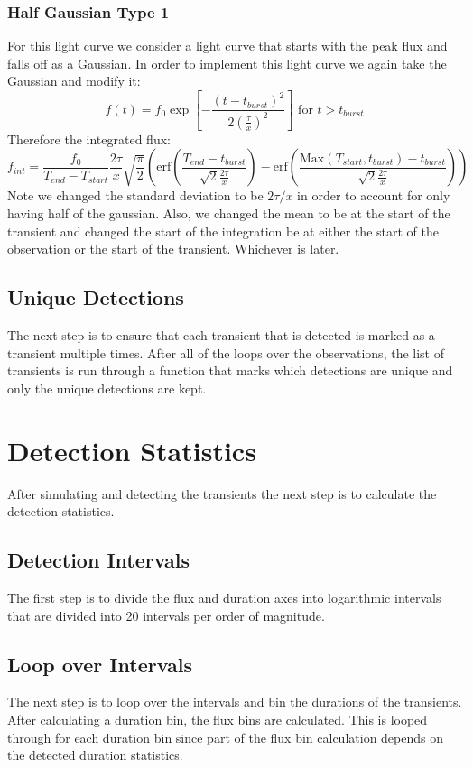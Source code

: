 \documentclass{article}
\begin{document}
\subsubsection{Half Gaussian Type 1}
For this light curve we consider a light curve that starts with the peak flux and falls off as a Gaussian. In order to implement this light curve we again take the Gaussian and modify it:
\[f(t) = f_0  \exp[-\frac{(t-t_{burst})^2}{2(\frac{\tau}{x})^2}]\text{ for }t>t_{burst}\]
Therefore the integrated flux:
\[f_{int} = \frac{f_0}{T_{end}-T_{start}} \frac{2\tau}{x}\sqrt{\frac{\pi}{2}}(\text{erf}(\frac{T_{end}-t_{burst}}{\sqrt{2}\frac{2\tau}{x}})-\text{erf}(\frac{\text{Max}(T_{start},t_{burst})-t_{burst}}{\sqrt{2}\frac{2\tau}{x}}))\]
Note we changed the standard deviation to be $2\tau/x$ in order to account for only having half of the gaussian. Also, we changed the mean to be at the start of the transient and changed the start of the integration be at either the start of the observation or the start of the transient. Whichever is later.
\subsection{Unique Detections}
The next step is to ensure that each transient that is detected is marked as a transient multiple times. After all of the loops over the observations, the list of transients is run through a function that marks which detections are unique and only the unique detections are kept.

\section{Detection Statistics}
After simulating and detecting the transients the next step is to calculate the detection statistics. 

\subsection{Detection Intervals}
The first step is to divide the flux and duration axes into logarithmic intervals that are divided into 20 intervals per order of magnitude. 
\subsection{Loop over Intervals}
The next step is to loop over the intervals and bin the durations of the transients. After calculating a duration bin, the flux bins are calculated. This is looped through for each duration bin since part of the flux bin calculation depends on the detected duration statistics. 
\end{document}
